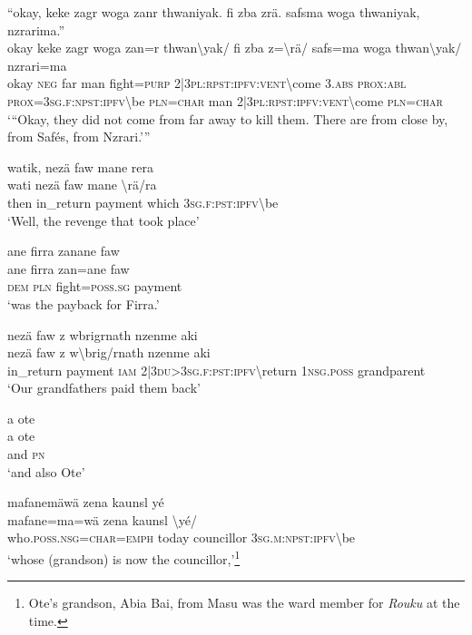 \ea\label{ex:4:a1755}
``okay, keke zagr woga zanr thwaniyak. fi zba zrä. safsma woga thwaniyak, nzrarima.''\\
\gll okay	keke	zagr	woga	zan=r	thwan{\textbackslash}yak/	fi	zba	z={\textbackslash}rä/	safs=ma	woga	thwan{\textbackslash}yak/	nzrari=ma\\
     okay	\textsc{neg}	far	man	fight=\textsc{purp}	2|3\textsc{pl}:\textsc{rpst}:\textsc{ipfv}:\textsc{vent}{\textbackslash}come	3.\textsc{abs}	\textsc{prox}:\textsc{abl}	\textsc{prox}=3\textsc{sg}.\textsc{f}:\textsc{npst}:\textsc{ipfv}{\textbackslash}be	\textsc{pln}=\textsc{char}	man	2|3\textsc{pl}:\textsc{rpst}:\textsc{ipfv}:\textsc{vent}{\textbackslash}come	\textsc{pln}=\textsc{char}\\
\glt `{``}Okay, they did not come from far away to kill them. There are from close by, from Safés, from Nzrari.'''
\z

\ea\label{ex:4:a1757}
watik, nezä faw mane rera\\
\gll wati	nezä	faw	mane	{\textbackslash}rä/ra\\
     then	in\_return	payment	which	3\textsc{sg}.\textsc{f}:\textsc{pst}:\textsc{ipfv}{\textbackslash}be\\
\glt `Well, the revenge that took place'
\z

\ea\label{ex:4:a1758}
ane firra zanane faw\\
\gll ane	firra	zan=ane	faw\\
     \textsc{dem}	\textsc{pln}	fight=\textsc{poss}.\textsc{sg}	payment\\
\glt `was the payback for Firra.'
\z

\ea\label{ex:4:a1759}
nezä faw z wbrigrnath nzenme aki\\
\gll nezä	faw	z	w{\textbackslash}brig/rnath	nzenme	aki\\
     in\_return	payment	\textsc{iam}	2|3\textsc{du}>3\textsc{sg}.\textsc{f}:\textsc{pst}:\textsc{ipfv}{\textbackslash}return	1\textsc{nsg}.\textsc{poss}	grandparent\\
\glt `Our grandfathers paid them back'
\z

\ea\label{ex:4:a1760}
a ote\\
\gll a	ote\\
     and	\textsc{pn}\\
\glt `and also Ote'
\z

\ea\label{ex:4:a1762}
mafanemäwä zena kaunsl yé\\
\gll mafane=ma=wä	zena	kaunsl	{\textbackslash}yé/\\
     who.\textsc{poss}.\textsc{nsg}=\textsc{char}=\textsc{emph}	today	councillor	3\textsc{sg}.\textsc{m}:\textsc{npst}:\textsc{ipfv}{\textbackslash}be\\
\glt `whose (grandson) is now the councillor,'\footnote{Ote's grandson, Abia Bai, from Masu was the ward member for \textit{Rouku} at the time.}
\z

